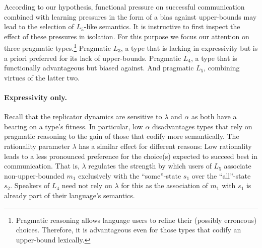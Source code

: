 \documentclass[a4paper]{article}
\begin{document}
%

According to our hypothesis, functional pressure on successful communication combined with learning pressures in the form of a bias against upper-bounds may lead to the selection of $L_5$-like semantics. It is instructive to first inspect the effect of these pressures in isolation. For this purpose we focus our attention on three pragmatic types.\footnote{Pragmatic reasoning allows language users to refine their (possibly erroneous) choices. Therefore, it is advantageous even for those types that codify an upper-bound lexically.} Pragmatic $L_3$, a type that is lacking in expressivity but is a priori preferred for its lack of upper-bounds. Pragmatic $L_4$, a type that is functionally advantageous but biased against. And pragmatic $L_5$, combining virtues of the latter two.  

\paragraph{Expressivity only.} Recall that the replicator dynamics are sensitive to $\lambda$ and $\alpha$ as both have a bearing on a type's fitness. In particular, low $\alpha$ disadvantages types that rely on pragmatic reasoning to the gain of those that codify more semantically. The rationality parameter $\lambda$ has a similar effect for different reasons: Low rationality leads to a less pronounced preference for the choice(s) expected to succeed best in communication. That is, $\lambda$ regulates the strength by which users of $L_5$ associate non-upper-bounded $m_1$ exclusively with the ``some''-state $s_1$ over the ``all''-state $s_2$. Speakers of $L_4$ need not rely on $\lambda$ for this as the association of $m_1$ with $s_1$ is already part of their language's semantics.
\end{document}
